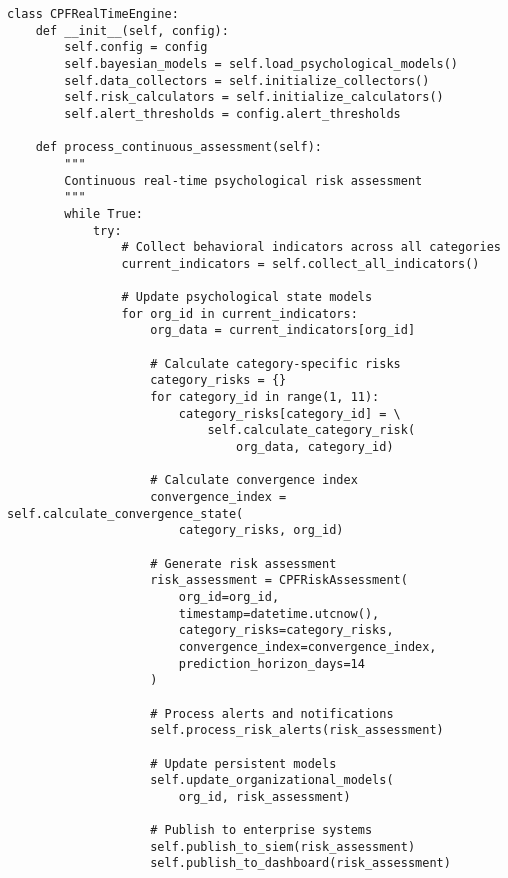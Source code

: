 \documentclass[10pt,twocolumn]{IEEEtran}
\begin{document}
\begin{lstlisting}[caption={Real-Time CPF Processing Engine}]
class CPFRealTimeEngine:
    def __init__(self, config):
        self.config = config
        self.bayesian_models = self.load_psychological_models()
        self.data_collectors = self.initialize_collectors()
        self.risk_calculators = self.initialize_calculators()
        self.alert_thresholds = config.alert_thresholds
        
    def process_continuous_assessment(self):
        """
        Continuous real-time psychological risk assessment
        """
        while True:
            try:
                # Collect behavioral indicators across all categories
                current_indicators = self.collect_all_indicators()
                
                # Update psychological state models
                for org_id in current_indicators:
                    org_data = current_indicators[org_id]
                    
                    # Calculate category-specific risks
                    category_risks = {}
                    for category_id in range(1, 11):
                        category_risks[category_id] = \
                            self.calculate_category_risk(
                                org_data, category_id)
                    
                    # Calculate convergence index
                    convergence_index = self.calculate_convergence_state(
                        category_risks, org_id)
                    
                    # Generate risk assessment
                    risk_assessment = CPFRiskAssessment(
                        org_id=org_id,
                        timestamp=datetime.utcnow(),
                        category_risks=category_risks,
                        convergence_index=convergence_index,
                        prediction_horizon_days=14
                    )
                    
                    # Process alerts and notifications
                    self.process_risk_alerts(risk_assessment)
                    
                    # Update persistent models
                    self.update_organizational_models(
                        org_id, risk_assessment)
                    
                    # Publish to enterprise systems
                    self.publish_to_siem(risk_assessment)
                    self.publish_to_dashboard(risk_assessment)
                

\end{lstlisting}
\end{document}
